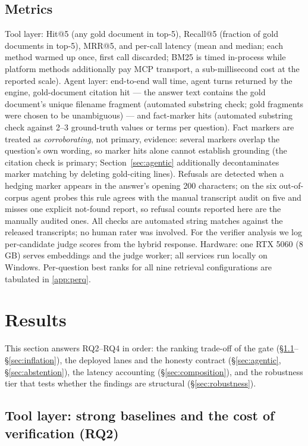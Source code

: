 \documentclass[preprint,12pt]{elsarticle}
\begin{document}
\subsection{Metrics}
Tool layer: Hit@5 (any gold document in top-5), Recall@5 (fraction of gold
documents in top-5), MRR@5, and per-call latency (mean and median; each
method warmed up once, first call discarded; BM25 is timed in-process
while platform methods additionally pay MCP transport, a sub-millisecond
cost at the reported scale). Agent layer: end-to-end wall
time, agent turns returned by the engine, gold-document citation hit ---
the answer text contains the gold document's unique filename fragment
(automated substring check; gold fragments were chosen to be unambiguous) ---
and fact-marker hits (automated substring check against 2--3
ground-truth values or terms per question). Fact markers are treated as
\emph{corroborating}, not primary, evidence: several markers overlap the
question's own wording, so marker hits alone cannot establish grounding
(the citation check is primary; Section~\ref{sec:agentic} additionally
decontaminates marker matching by deleting gold-citing lines). Refusals
are detected when a hedging marker appears in the answer's opening 200
characters; on the six out-of-corpus agent probes this rule agrees with
the manual transcript audit on five and misses one explicit not-found
report, so refusal counts reported here are the manually audited ones. All checks
are automated string matches against the released transcripts; no human
rater was involved. For the verifier analysis we log per-candidate judge
scores from the hybrid response. Hardware: one RTX 5060 (8\,GB) serves
embeddings and the judge worker; all services run locally on Windows.
Per-question best ranks for all nine retrieval configurations are
tabulated in \ref{app:perq}.

\section{Results}
\label{sec:results}

This section answers RQ2--RQ4 in order: the ranking trade-off of the gate
(\S\ref{sec:retrieval}--\S\ref{sec:inflation}), the deployed lanes and the
honesty contract (\S\ref{sec:agentic}, \S\ref{sec:abstention}), the latency
accounting (\S\ref{sec:composition}), and the robustness tier that tests
whether the findings are structural (\S\ref{sec:robustness}).

\subsection{Tool layer: strong baselines and the cost of verification (RQ2)}
\label{sec:retrieval}
\end{document}
